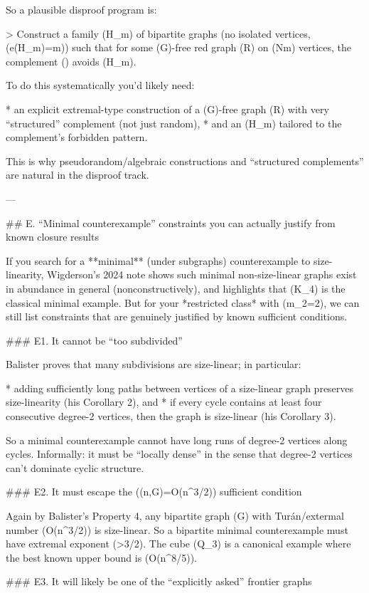 So a plausible disproof program is:

> Construct a family (H_m) of bipartite graphs (no isolated vertices, (e(H_m)=m)) such that for some (G)-free red graph (R) on (N\gg m) vertices, the complement () avoids (H_m).

To do this systematically you’d likely need:

* an explicit extremal-type construction of a (G)-free graph (R) with very “structured” complement (not just random),
* and an (H_m) tailored to the complement’s forbidden pattern.

This is why pseudorandom/algebraic constructions and “structured complements” are natural in the disproof track.

---

## E. “Minimal counterexample” constraints you can actually justify from known closure results

If you search for a **minimal** (under subgraphs) counterexample to size-linearity, Wigderson’s 2024 note shows such minimal non-size-linear graphs exist in abundance in general (nonconstructively), and highlights that (K_4) is the classical minimal example.
But for your *restricted class* with (m_2=2), we can still list constraints that are genuinely justified by known sufficient conditions.

### E1. It cannot be “too subdivided”

Balister proves that many subdivisions are size-linear; in particular:

* adding sufficiently long paths between vertices of a size-linear graph preserves size-linearity (his Corollary 2), and
* if every cycle contains at least four consecutive degree-2 vertices, then the graph is size-linear (his Corollary 3).

So a minimal counterexample cannot have long runs of degree-2 vertices along cycles. Informally: it must be “locally dense” in the sense that degree-2 vertices can’t dominate cyclic structure.

### E2. It must escape the ((n,G)=O(n^{3/2})) sufficient condition

Again by Balister’s Property 4, any bipartite graph (G) with Turán/extermal number (O(n^{3/2})) is size-linear.
So a bipartite minimal counterexample must have extremal exponent (>3/2). The cube (Q_3) is a canonical example where the best known upper bound is (O(n^{8/5})).

### E3. It will likely be one of the “explicitly asked” frontier graphs

